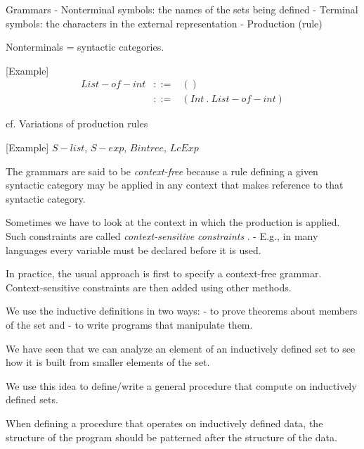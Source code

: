 \documentclass{article}
\newcommand{\mm}{\!\!-\!\!}
\begin{document}
\begin{huge}
Grammars\al
- Nonterminal symbols: the names of the sets being defined \al
- Terminal symbols: the characters in the external representation\al
- Production (rule)

Nonterminals = syntactic categories.

[Example]
\begin{eqnarray*}
List\mm of\mm int & ::= & ()\\
                & ::= & (Int \ . \ List\mm of\mm int)
\end{eqnarray*}

cf. Variations of production rules

[Example] $S\mm list$, $S\mm exp$, $Bintree$, $LcExp$


The grammars are said to be {\it context-free} because a rule defining a given syntactic category may be applied in any context that makes reference to that syntactic category.

Sometimes we have to look at the context in which the production is applied. Such constraints are called {\it context-sensitive constraints} .\al
- E.g., in many languages every variable must be declared before it is used. 

In practice, the usual approach is first to specify a context-free grammar. Context-sensitive constraints are then added using other methods. 


We use the inductive definitions in two ways:\al
- to prove theorems about members of the set and\al
- to write programs that manipulate them.


We have seen that we can analyze an element of an inductively defined set to see how it is built from smaller elements of the set.

We use this idea to define/write a general procedure that compute on inductively defined sets.

When defining a procedure that operates on inductively defined data, the structure of the program should be patterned after the structure of the data.


\end{huge}
\end{document}
